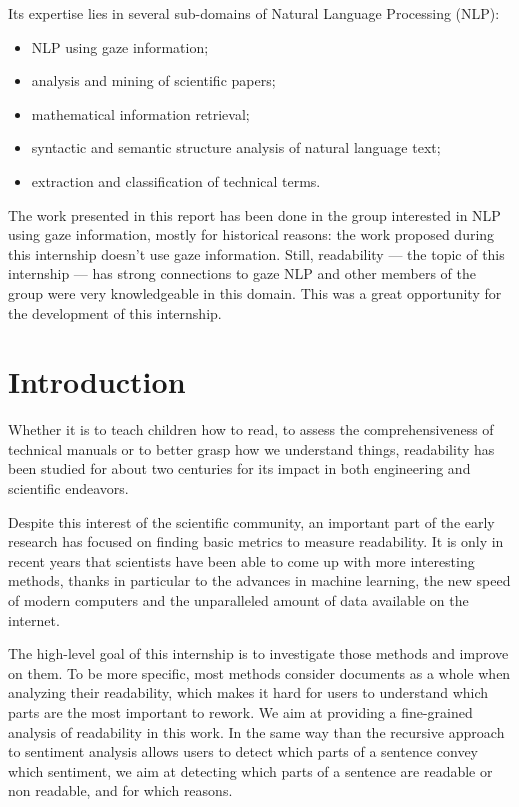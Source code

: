 \documentclass[a4paper, 11pt, onepage]{scrreprt}
\begin{document}
Its expertise lies in several sub-domains of Natural Language
Processing (NLP):
\begin{itemize}
\item NLP using gaze information;
\item analysis and mining of scientific papers;
\item mathematical information retrieval;
\item syntactic and semantic structure analysis of natural language
  text;
\item extraction and classification of technical terms.
\end{itemize}

The work presented in this report has been done in the group
interested in NLP using gaze information, mostly for historical
reasons: the work proposed during this internship doesn't use gaze
information. Still, readability — the topic of this internship — has
strong connections to gaze NLP and other members of the group were
very knowledgeable in this domain. This was a great opportunity for
the development of this internship.

\chapter{Introduction}

Whether it is to teach children how to read, to assess the
comprehensiveness of technical manuals or to better grasp how we
understand things, readability has been studied for about two
centuries for its impact in both engineering and scientific endeavors.

Despite this interest of the scientific community, an important part
of the early research has focused on finding basic metrics to measure
readability. It is only in recent years that scientists have been able
to come up with more interesting methods, thanks in particular to the
advances in machine learning, the new speed of modern computers and
the unparalleled amount of data available on the internet.

The high-level goal of this internship is to investigate those methods
and improve on them. To be more specific, most methods consider
documents as a whole when analyzing their readability, which makes it
hard for users to understand which parts are the most important to
rework. We aim at providing a fine-grained analysis of readability in
this work. In the same way than the recursive approach to sentiment
analysis \cite{socher2013recursive} allows users to detect which parts
of a sentence convey which sentiment, we aim at detecting which parts
of a sentence are readable or non readable, and for which reasons.
\end{document}
